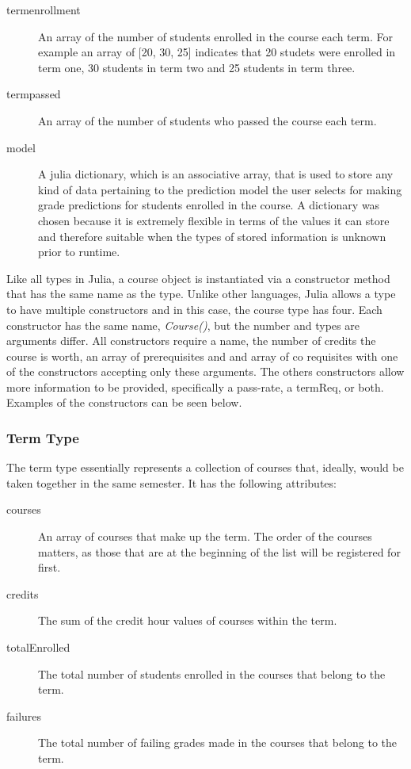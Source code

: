 \documentclass[botnum, fleqn]{unmeethesis}
\begin{document}
\begin{description}
        \item [termenrollment] An array of the number of students enrolled in the course each term. For example an array of [20, 30, 25] indicates that 20 studets were enrolled in term one, 30 students in term two and 25 students in term three.
        \item [termpassed] An array of the number of students who passed the course each term.
        \item [model] A julia dictionary, which is an associative array, that is used to store any kind of data pertaining to the prediction model the user selects for making grade predictions for students enrolled in the course. A dictionary was chosen because it is extremely flexible in terms of the values it can store and therefore suitable when the types of stored information is unknown prior to runtime.
      \end{description}

      Like all types in Julia, a course object is instantiated via a constructor method that has the same name as the type. Unlike other languages, Julia allows a type to have multiple constructors and in this case, the course type has four. Each constructor has the same name, \textit{Course()}, but the number and types are arguments differ. All constructors require a name, the number of credits the course is worth, an array of prerequisites and and array of co requisites with one of the constructors accepting only these arguments. The others constructors allow more information to be provided, specifically a pass-rate, a termReq, or both. Examples of the constructors can be seen below.

      

    \subsubsection{Term Type}
      The term type essentially represents a collection of courses that, ideally, would be taken together in the same semester. It has the following attributes:

      \begin{description}
        \item [courses] An array of courses that make up the term. The order of the courses matters, as those that are at the beginning of the list will be registered for first.
        \item [credits] The sum of the credit hour values of courses within the term.
        \item [totalEnrolled] The total number of students enrolled in the courses that belong to the term.
        \item [failures] The total number of failing grades made in the courses that belong to the term.
      \end{description}
\end{document}
